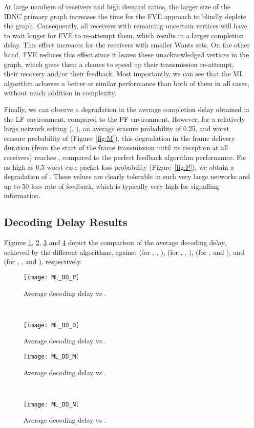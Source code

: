\documentclass[10pt,jounral]{IEEEtran}
\newcommand{\fref}[1]{Figure~\ref{#1}}
\begin{document}
At large numbers of receivers and high demand ratios, the larger size of the IDNC primary graph increases the time for the FVE approach to blindly deplete the graph. Consequently, all receivers with remaining uncertain vertices will have to wait longer for FVE to re-attempt them, which results in a larger completion delay. This effect increases for the receivers with smaller Wants sets. On the other hand, FVE reduces this effect since it leaves these unacknowledged vertices in the graph, which gives them a chance to speed up their transmission re-attempt, their recovery and/or their feedback. Most importantly, we can see that the ML algorithm achieves a better or similar performance than both of them in all cases, without much addition in complexity.

Finally, we can observe a degradation in the average completion delay obtained in the LF environment, compared to the PF environment. However, for a relatively large network setting (, ), an average erasure probability of 0.25, and worst erasure probability of  (\fref{fig:M}), this degradation in the frame delivery duration (from the start of the frame transmission until its reception at all receivers) reaches , compared to the perfect feedback algorithm performance. For as high as 0.5 worst-case packet loss probability (\fref{fig:P}), we obtain a degradation of . These values are clearly tolerable in such very large networks and up to 50 loss rate of feedback, which is typically very high for signalling information.


\subsection{Decoding Delay Results}
Figures \ref{fig:PP}, \ref{fig:DD}, \ref{fig:MM} and \ref{fig:NN} depict the comparison of the average decoding delay, achieved by the different algorithms, against  (for , , ),  (for , , ),  (for ,  and ), and  (for , , and ), respectively.

\begin{figure*}[t]
\centering
    \begin{subfigure}[b]{0.5\textwidth}
    \centering
    \texttt{[image: ML\_DD\_P]}
    \caption{Average decoding delay vs .} \label{fig:PP}
    \end{subfigure}~
    \begin{subfigure}[b]{0.5\textwidth}
    \centering
    \texttt{[image: ML\_DD\_D]}
    \caption{Average decoding delay vs .} \label{fig:DD}
    \end{subfigure}

    \begin{subfigure}[b]{0.5\textwidth}
    \centering
    \texttt{[image: ML\_DD\_M]}
    \caption{Average decoding delay vs .} \label{fig:MM}
    \end{subfigure}~
    \begin{subfigure}[b]{0.5\textwidth}
    \centering
    \texttt{[image: ML\_DD\_N]}
    \caption{Average decoding delay vs .} \label{fig:NN}
    \end{subfigure}
    \caption{Decoding delay results}
\end{figure*}
\end{document}
